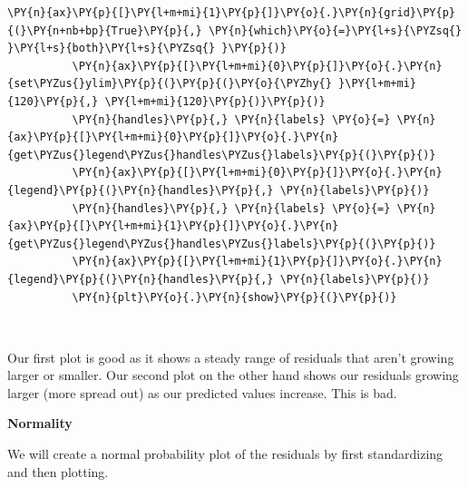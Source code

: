 \documentclass[10pt]{article}\usepackage[]{graphicx}\usepackage[]{xcolor}
\begin{document}
\begin{Verbatim}[commandchars=\\\{\}]
          \PY{n}{ax}\PY{p}{[}\PY{l+m+mi}{1}\PY{p}{]}\PY{o}{.}\PY{n}{grid}\PY{p}{(}\PY{n+nb+bp}{True}\PY{p}{,} \PY{n}{which}\PY{o}{=}\PY{l+s}{\PYZsq{} }\PY{l+s}{both}\PY{l+s}{\PYZsq{} }\PY{p}{)}
          \PY{n}{ax}\PY{p}{[}\PY{l+m+mi}{0}\PY{p}{]}\PY{o}{.}\PY{n}{set\PYZus{}ylim}\PY{p}{(}\PY{p}{(}\PY{o}{\PYZhy{} }\PY{l+m+mi}{120}\PY{p}{,} \PY{l+m+mi}{120}\PY{p}{)}\PY{p}{)}
          \PY{n}{handles}\PY{p}{,} \PY{n}{labels} \PY{o}{=} \PY{n}{ax}\PY{p}{[}\PY{l+m+mi}{0}\PY{p}{]}\PY{o}{.}\PY{n}{get\PYZus{}legend\PYZus{}handles\PYZus{}labels}\PY{p}{(}\PY{p}{)}
          \PY{n}{ax}\PY{p}{[}\PY{l+m+mi}{0}\PY{p}{]}\PY{o}{.}\PY{n}{legend}\PY{p}{(}\PY{n}{handles}\PY{p}{,} \PY{n}{labels}\PY{p}{)}
          \PY{n}{handles}\PY{p}{,} \PY{n}{labels} \PY{o}{=} \PY{n}{ax}\PY{p}{[}\PY{l+m+mi}{1}\PY{p}{]}\PY{o}{.}\PY{n}{get\PYZus{}legend\PYZus{}handles\PYZus{}labels}\PY{p}{(}\PY{p}{)}
          \PY{n}{ax}\PY{p}{[}\PY{l+m+mi}{1}\PY{p}{]}\PY{o}{.}\PY{n}{legend}\PY{p}{(}\PY{n}{handles}\PY{p}{,} \PY{n}{labels}\PY{p}{)}
          \PY{n}{plt}\PY{o}{.}\PY{n}{show}\PY{p}{(}\PY{p}{)}
\end{Verbatim}

    \begin{center}
    \end{center}
    { \hspace*{\fill} \\}
    
    Our first plot is good as it shows a steady range of residuals that
aren't growing larger or smaller. Our second plot on the other hand
shows our residuals growing larger (more spread out) as our predicted
values increase. This is bad.

\textbf{Normality}

We will create a normal probability plot of the residuals by first
standardizing and then plotting.
\end{document}
